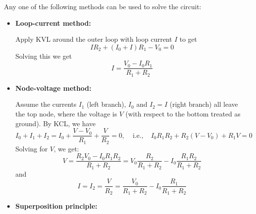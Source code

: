 \documentclass{article}
\begin{document}
Any one of the following methods can be used to solve the circuit:
\begin{itemize}

\item {\bf Loop-current method:}

  Apply KVL around the outer loop with loop current $I$ to get
  \begin{equation}
    I R_2+(I_0+I) R_1-V_0=0
  \end{equation}
  Solving this we get
  \begin{equation}
    I=\frac{V_0-I_0 R_1}{R_1+R_2}
  \end{equation}
  
\item {\bf Node-voltage method:}

  Assume the currents $I_1$ (left branch), $I_0$ and $I_2=I$ (right branch)
  all leave the top node, where the voltage is $V$ (with respect to the 
  bottom treated as ground). By KCL, we have
  \begin{equation}
    I_0+I_1+I_2=I_0+\frac{V-V_0}{R_1}+\frac{V}{R_2}=0,\;\;\;\;\mbox{i.e.,}\;\;\;\;
    I_0R_1R_2+R_2(V-V_0)+R_1V=0 
  \end{equation}
  Solving for $V$, we get:
  \begin{equation}
    V=\frac{R_2V_0-I_0R_1R_2}{R_1+R_2}
    =V_0\frac{R_2}{R_1+R_2}-I_0\frac{R_1R_2}{R_1+R_2} 
  \end{equation}
  and
  \begin{equation}
    I=I_2=\frac{V}{R_2}=\frac{V_0}{R_1+R_2}-I_0\frac{R_1}{R_1+R_2} 
  \end{equation}

\item {\bf Superposition principle:}



\end{itemize}
\end{document}
